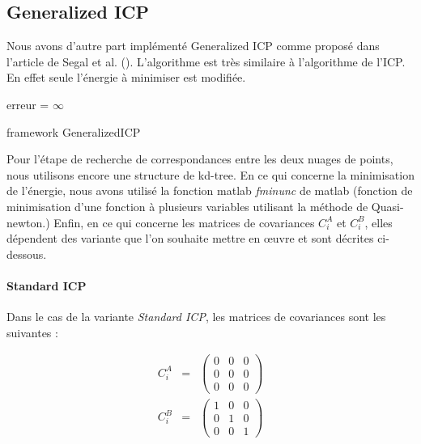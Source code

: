 \subsection{Generalized ICP}
Nous avons d'autre part implémenté Generalized ICP comme proposé dans l'article de Segal et al. (\cite{bib_gicp}). L'algorithme est très similaire à l'algorithme de l'ICP. En effet seule l'énergie à minimiser est modifiée.\\

\begin{algorithm}[H]
erreur = $\infty$\;
\caption{framework GeneralizedICP}
\label{algo_gicp}
\end{algorithm}

Pour l'étape de recherche de correspondances entre les deux nuages de points, nous utilisons encore une structure de kd-tree. 
En ce qui concerne la minimisation de l'énergie, nous avons utilisé la fonction matlab \textit{fminunc} de matlab (fonction de minimisation d'une fonction à plusieurs variables utilisant la méthode de Quasi-newton.)
Enfin, en ce qui concerne les matrices de covariances $C_{i}^{A}$ et $C_{i}^{B}$, elles dépendent des variante que l'on souhaite mettre en œuvre et sont décrites ci-dessous.

\paragraph{Standard ICP}
Dans le cas de la variante \textit{Standard ICP}, les matrices de covariances sont les suivantes :

\begin{eqnarray}
C_{i}^A &=& 
\begin{pmatrix}
0 & 0 & 0\\
0 & 0 & 0\\
0 & 0 & 0
\end{pmatrix}\\
C_{i}^B &=& 
\begin{pmatrix}
1 & 0 & 0\\
0 & 1 & 0\\
0 & 0 & 1
\end{pmatrix}
\end{eqnarray}

